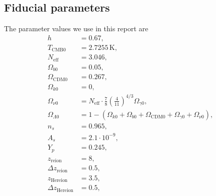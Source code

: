 \documentclass{aa}
\newcommand{\pclosed}[1]{\left( #1 \right)}
\newcommand{\unit}[1]{\,\mathrm{#1}}
\newcommand{\obn}{\Omega_{b0}}
\newcommand{\ocdmn}{\Omega_\mathrm{CDM0}}
\newcommand{\ogn}{\Omega_{\gamma 0}}
\newcommand{\onun}{\Omega_{\nu 0}}
\newcommand{\okn}{\Omega_{k0}}
\newcommand{\oln}{\Omega_{\Lambda 0}}
\newcommand{\tcmb}{T_\mathrm{CMB0}}
\begin{document}
\begin{appendix}
\section{Fiducial parameters} \label{app:M1:fiducial_parameters}
The parameter values we use in this report are 
\begin{equation} \label{eq:Appendix:Fiducial_cosmology_parameters}
      \begin{split}
            h &= 0.67, \\ 
            \tcmb &= 2.7255\unit{K}, \\
            N_\mathrm{eff} &= 3.046, \\
            \obn &= 0.05, \\
            \ocdmn &= 0.267,\\
            \okn &=0,\\
            \onun &= N_\mathrm{eff} \cdot \frac{7}{8} \pclosed{\frac{4}{11}}^{4/3} \ogn, \\
            \oln &= 1 - (\okn + \obn + \ocdmn + \ogn + \onun), \\
            n_s &= 0.965,\\
            A_s &= 2.1\cdot 10^{-9},\\
            Y_p &= 0.245, \\
            z_\mathrm{reion} &= 8, \\
            \Delta z_\mathrm{reion} &= 0.5, \\
            z_\mathrm{Hereion} &= 3.5, \\
            \Delta z_\mathrm{Hereion} &= 0.5, \\
      \end{split}
\end{equation}


\end{appendix}
\end{document}
